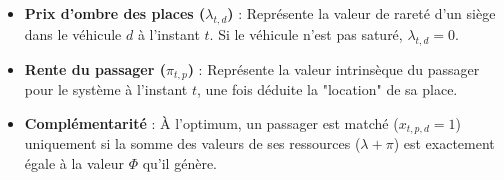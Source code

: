 \documentclass[12pt]{article}
\begin{document}
\begin{itemize}
    \item \textbf{Prix d'ombre des places ($\lambda_{t,d}$)} : Représente la valeur de rareté d'un siège dans le véhicule $d$ à l'instant $t$. Si le véhicule n'est pas saturé, $\lambda_{t,d} = 0$.
    \item \textbf{Rente du passager ($\pi_{t,p}$)} : Représente la valeur intrinsèque du passager pour le système à l'instant $t$, une fois déduite la "location" de sa place.
    \item \textbf{Complémentarité} : À l'optimum, un passager est matché ($x_{t,p,d} = 1$) uniquement si la somme des valeurs de ses ressources ($\lambda + \pi$) est exactement égale à la valeur $\Phi$ qu'il génère.
\end{itemize}
\end{document}
